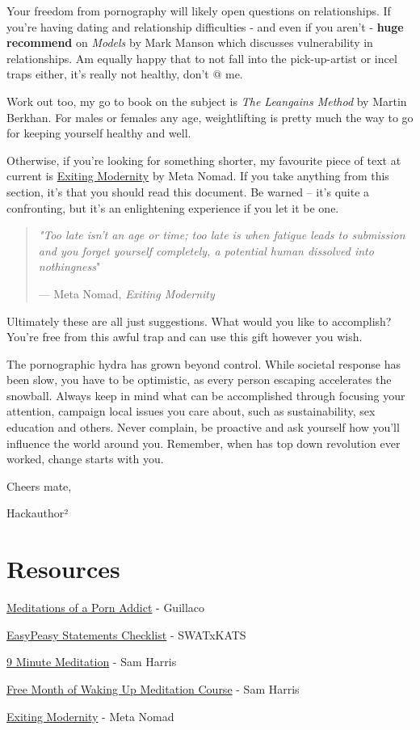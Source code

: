 \documentclass[
]{book}
\begin{document}
Your freedom from pornography will likely open questions on relationships. If you're having dating and relationship difficulties - and even if you aren't - \textbf{huge recommend} on \emph{Models} by Mark Manson which discusses vulnerability in relationships. Am equally happy that to not fall into the pick-up-artist or incel traps either, it's really not healthy, don't @ me.

Work out too, my go to book on the subject is \emph{The Leangains Method} by Martin Berkhan. For males or females any age, weightlifting is pretty much the way to go for keeping yourself healthy and well.

Otherwise, if you're looking for something shorter, my favourite piece of text at current is \href{https://www.meta-nomad.net/exiting-modernity/}{Exiting Modernity} by Meta Nomad. If you take anything from this section, it's that you should read this document. Be warned -- it's quite a confronting, but it's an enlightening experience if you let it be one.

\begin{quote}
\emph{"Too late isn't an age or time; too late is when fatigue leads to submission and you forget yourself completely, a potential human dissolved into nothingness}"

--- Meta Nomad, \emph{Exiting Modernity}
\end{quote}

Ultimately these are all just suggestions. What would you like to accomplish? You're free from this awful trap and can use this gift however you wish.

The pornographic hydra has grown beyond control. While societal response has been slow, you have to be optimistic, as every person escaping accelerates the snowball. Always keep in mind what can be accomplished through focusing your attention, campaign local issues you care about, such as sustainability, sex education and others. Never complain, be proactive and ask yourself how you'll influence the world around you. Remember, when has top down revolution ever worked, change starts with you.

Cheers mate,

Hackauthor²

\hypertarget{resources}{%
\chapter*{Resources}\label{resources}}

\href{https://mega.nz/file/DlxiFACJ\#FLglnhxnenKVIDn9JVQHI1v_ZGs1yzC3Kvc0mLf13ds}{Meditations of a Porn Addict} - Guillaco

\href{https://pastebin.com/dybv6qkD}{EasyPeasy Statements Checklist} - SWATxKATS

\href{https://www.youtube.com/watch?v=tw7XBKhZJh4}{9 Minute Meditation} - Sam Harris

\href{https://share.wakingup.com/a13290}{Free Month of Waking Up Meditation Course} - Sam Harris

\href{https://meta-nomad.net/exiting-modernity}{Exiting Modernity} - Meta Nomad

  
\end{document}

